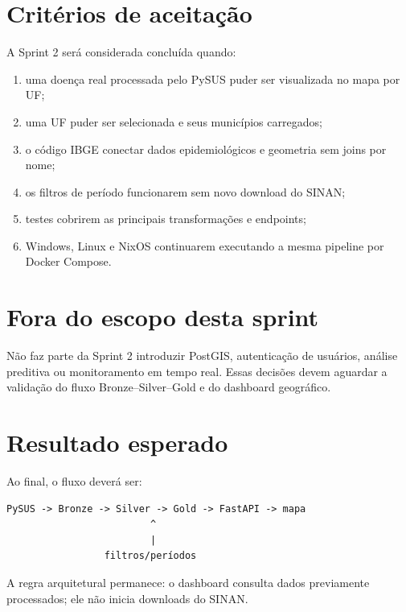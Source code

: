 \documentclass[12pt,a4paper]{article}
\begin{document}
\section{Critérios de aceitação}
A Sprint 2 será considerada concluída quando:
\begin{enumerate}
\item uma doença real processada pelo PySUS puder ser visualizada no mapa por UF;
\item uma UF puder ser selecionada e seus municípios carregados;
\item o código IBGE conectar dados epidemiológicos e geometria sem joins por nome;
\item os filtros de período funcionarem sem novo download do SINAN;
\item testes cobrirem as principais transformações e endpoints;
\item Windows, Linux e NixOS continuarem executando a mesma pipeline por Docker Compose.
\end{enumerate}

\section{Fora do escopo desta sprint}
Não faz parte da Sprint 2 introduzir PostGIS, autenticação de usuários, análise preditiva ou monitoramento em tempo real. Essas decisões devem aguardar a validação do fluxo Bronze--Silver--Gold e do dashboard geográfico.

\section{Resultado esperado}
Ao final, o fluxo deverá ser:
\begin{verbatim}
PySUS -> Bronze -> Silver -> Gold -> FastAPI -> mapa
                         ^
                         |
                 filtros/períodos
\end{verbatim}
A regra arquitetural permanece: o dashboard consulta dados previamente processados; ele não inicia downloads do SINAN.
\end{document}
